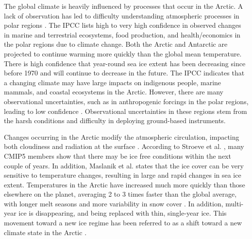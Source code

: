 The global climate is heavily influenced by processes that occur in the Arctic. A lack of observation has led to difficulty understanding atmospheric processes in polar regions \cite{Persson:2002ka}. The IPCC \cite{IPCC:14} lists high to very high confidence in observed changes in marine and terrestrial ecosystems, food production, and health/economics in the polar regions due to climate change. Both the Arctic and Antarctic are projected to continue warming more quickly than the global mean temperature. There is high confidence that year-round sea ice extent has been decreasing since before 1970 and will continue to decrease in the future. The IPCC \cite{IPCC:14} indicates that a changing climate may have large impacts on indigenous people, marine mammals, and coastal ecosystems in the Arctic. However, there are many observational uncertainties, such as in anthropogenic forcings in the polar regions, leading to low confidence \cite{IPCC:14}. Observational uncertainties in these regions stem from the harsh conditions and difficulty in deploying ground-based instruments.

Changes occurring in the Arctic modify the atmospheric circulation, impacting both cloudiness and radiation at the surface \cite{Zhang:2008cn}. According to Stroeve et al. \cite{Stroeve:2012dl}, many CMIP5 members show that there may be ice free conditions within the next couple of years. In addition, Maslanik et al. \cite{Maslanik:2007ha} states that the ice cover can be very sensitive to temperature changes, resulting in large and rapid changes in sea ice extent. Temperatures in the Arctic have increased much more quickly than those elsewhere on the planet, averaging 2 to 3 times faster than the global average, with longer melt seasons and more variability in snow cover \cite{Sledd:2019bz} \cite{AACI:05}. In addition, multi-year ice is disappearing, and being replaced with thin, single-year ice. This movement toward a new ice regime has been referred to as a shift toward a new climate state in the Arctic \cite{Verlinde:2007fu}.  

